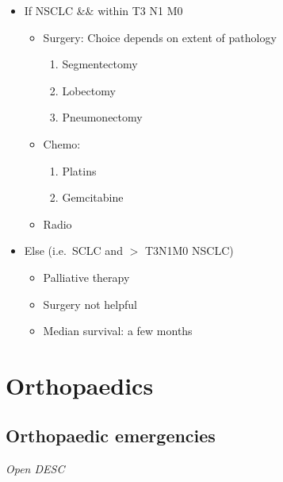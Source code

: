 \documentclass[
  14pt,
]{memoir}
\providecommand{\tightlist}{%
  \setlength{\itemsep}{0pt}\setlength{\parskip}{0pt}}
\begin{document}
\begin{itemize}
\tightlist
\item
  If NSCLC \&\& within T3 N1 M0

  \begin{itemize}
  \tightlist
  \item
    Surgery: Choice depends on extent of pathology

    \begin{enumerate}
    \def\labelenumi{\arabic{enumi}.}
    \tightlist
    \item
      Segmentectomy
    \item
      Lobectomy
    \item
      Pneumonectomy
    \end{enumerate}
  \item
    Chemo:

    \begin{enumerate}
    \def\labelenumi{\arabic{enumi}.}
    \tightlist
    \item
      Platins
    \item
      Gemcitabine
    \end{enumerate}
  \item
    Radio
  \end{itemize}
\item
  Else (i.e.~SCLC and \(>\) T3N1M0 NSCLC)

  \begin{itemize}
  \tightlist
  \item
    Palliative therapy
  \item
    Surgery not helpful
  \item
    Median survival: a few months
  \end{itemize}
\end{itemize}

\pagebreak

\hypertarget{orthopaedics}{%
\chapter{Orthopaedics}\label{orthopaedics}}

\hypertarget{orthopaedic-emergencies}{%
\section{Orthopaedic emergencies}\label{orthopaedic-emergencies}}

\emph{Open DESC}
\end{document}
